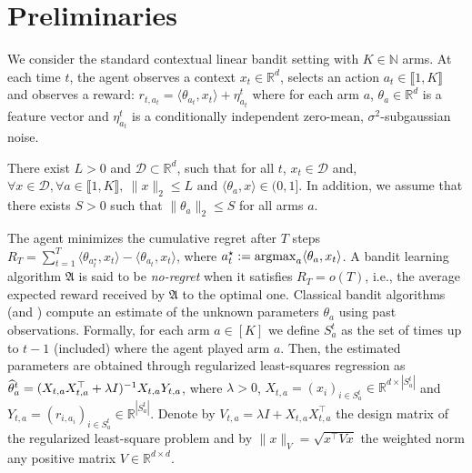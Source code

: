 \section{Preliminaries}\label{sec:preliminaries}
We consider the standard contextual linear bandit setting with $K\in \mathbb{N}$ arms. At each time $t$, the agent observes a context $x_{t}\in\mathbb{R}^{d}$, selects an action $a_{t}\in \llbracket 1, K\rrbracket$ and observes a reward: $r_{t,a_{t}} = \langle \theta_{a_{t}}, x_{t}\rangle + \eta_{a_{t}}^{t}$ where for each arm $a$, $\theta_{a}\in \mathbb{R}^{d}$ is a feature vector and $\eta_{a_{t}}^{t}$ is a conditionally independent zero-mean, $\sigma^{2}$-subgaussian noise.   
\begin{assump}\label{assumption1}
There exist $L>0$ and $\mathcal{D}\subset \mathbb{R}^{d}$, such that for all $t$, $x_{t}\in\mathcal{D}$ and, $\forall x\in\mathcal{D},\forall a\in\llbracket 1, K\rrbracket,~ \|x\|_{2} \leq L \text{ and } \langle \theta_{a}, x\rangle \in (0,1]$. In addition, we assume that there exists $S>0$ such that $\|\theta_{a}\|_{2}\leq S$ for all arms $a$.
\end{assump}
The agent minimizes the cumulative regret after $T$ steps $R_{T} = \sum_{t=1}^{T} \langle \theta_{a^{\star}_{t}}, x_{t}\rangle - \langle \theta_{a_{t}}, x_{t}\rangle$,
where $a_{t}^{\star} := \operatorname*{argmax}_{a} \langle \theta_{a}, x_{t}\rangle$.
A bandit learning algorithm $\mathfrak{A}$ is said to be \emph{no-regret} when it satisfies $R_{T} = o(T)$, i.e., the average expected reward received by $\mathfrak{A}$  to the optimal one. Classical bandit algorithms (\eg \linucb and \lints) compute an estimate of the unknown parameters $\theta_a$ using past observations. Formally, for each arm $a \in [K]$ we define $S_a^t$ as the set of times up to $t-1$ (included) where the agent played arm $a$. Then, the estimated parameters are obtained through regularized least-squares regression as $\widehat{\theta}_a^t = (X_{t,a} X_{t,a}^\top + \lambda I)^{-1} X_{t,a} Y_{t,a}$, where $\lambda > 0$, $X_{t,a} = (x_i)_{i \in S_a^t} \in \mathbb{R}^{d \times |S_a^t|}$ and $Y_{t,a} = (r_{i,a_i})_{i \in S_a^t} \in \mathbb{R}^{|S_a^t|}$.
Denote by $V_{t,a} = \lambda I + X_{t,a} X_{t,a}^\top$ the design matrix of the regularized least-square problem and by $\|x\|_{V} = \sqrt{x^\top V x}$ the weighted norm \wrt any positive matrix $V \in \mathbb{R}^{d \times d}$.
